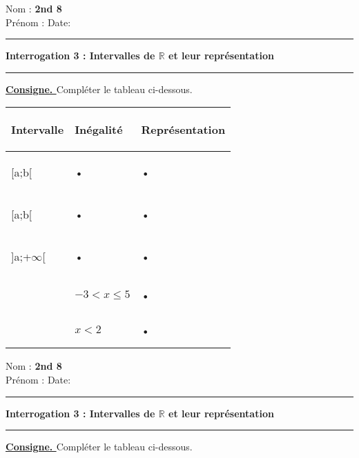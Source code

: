 \documentclass[a4paper,11pt]{article}
\newcommand{\R}{\mathbb{R}}
\newcommand{\titre}[5] 
{
\noindent #2 \hfill #4 \\
#3 \hfill #5

\vspace{-1.6cm}

\begin{center}\rule{6cm}{0.5mm}\end{center}
\vspace{0.2cm}
\begin{center}{\large{\textbf{#1}}}\end{center}
\begin{center}\rule{6cm}{0.5mm}\end{center}
}
\begin{document}
\pagestyle{empty}
\titre{Interrogation 3 : Intervalles de $\R$ et leur représentation }{Nom :}{Prénom :}{\textbf{2nd 8}}{Date:}


\textbf{\underline{Consigne. }} Compléter le tableau ci-dessous.


\begin{tabular}{|p{3cm}|p{6cm}|p{7cm}|}
\hline 

 \begin{center}
 \textbf{Intervalle}
 \end{center}
  & \begin{center}
 \textbf{Inégalité}
 \end{center} & \begin{center}
\textbf{Représentation}
\end{center} \\ 
\hline 

 \begin{center}
 [a;b[ 
 \end{center}& • & • \\ 
\hline 

\begin{center}
 [a;b[
 \end{center} & • & • \\ 
\hline 
\begin{center}
 ]a;+$\infty$[
 \end{center} & • & • \\ 
\hline 
 & \begin{center}
 $-3< x \le 5$
 \end{center} & • \\ 
\hline 
  & \begin{center}
  $x<2$
  \end{center} & • \\ 
\hline 


\end{tabular} 

\vspace*{1cm}


\titre{Interrogation 3 : Intervalles de $\R$ et leur représentation }{Nom :}{Prénom :}{\textbf{2nd 8}}{Date:}

\vspace*{0.5cm}

\textbf{\underline{Consigne. }} Compléter le tableau ci-dessous.
\end{document}
